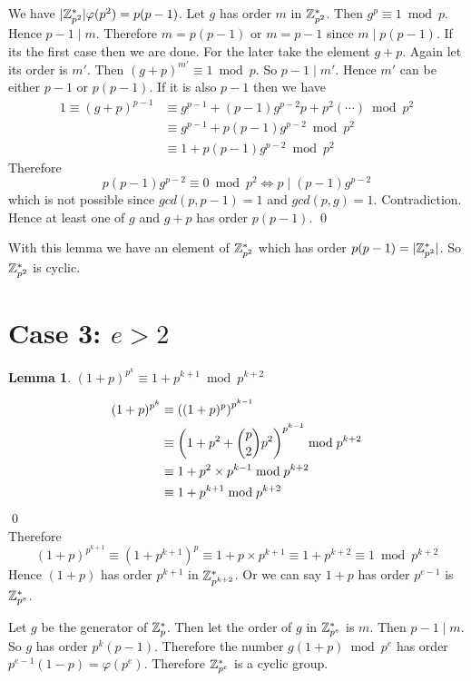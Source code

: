 \documentclass[a4paper, 11pt]{article}
\newtheorem{lemma}{Lemma}
\renewenvironment{proof}{\noindent{\it \textbf{Proof:}}\hspace*{1em}}{\qed\bigskip\\}
\begin{document}
{	\begin{proof}
		We have $|\mathbb{Z}_{p^2}^*|\varphi(p^2)=p(p-1)$. Let $g$ has order $m$ in $\mathbb{Z}_{p^2}^*$. Then $g^p\equiv 1\bmod p$. Hence $p-1\mid m$. Therefore $m=p(p-1)$ or $m=p-1$ since $m\mid p(p-1)$. If its the first case then we are done. For the later take the element $g+p$. Again let its order is $m'$. Then $(g+p)^{m'}\equiv 1\bmod p$. So $p-1\mid m'$. Hence $m'$ can be either $p-1$ or $p(p-1)$. If it is also $p-1$ then we have \begin{align*}
			1\equiv (g+p)^{p-1} & \equiv g^{p-1}+(p-1)g^{p-2}p+p^2(\cdots)\bmod {p^2}\\
			& \equiv g^{p-1}+p(p-1)g^{p-2}\bmod {p^2}\\
			& \equiv 1+p(p-1)g^{p-2}\bmod {p^2}
		\end{align*}
		Therefore $$p(p-1)g^{p-2}\equiv 0\bmod{p^2}\iff p\mid (p-1)g^{p-2}$$ which is not possible since $gcd(p,p-1)=1$ and $gcd(p,g)=1$. Contradiction. Hence at least one of $g$ and $g+p$ has order $p(p-1)$.  
	\end{proof}
	
	With this lemma we have an element of $\mathbb{Z}_{p^2}^*$ which has order $p(p-1)=|\mathbb{Z}_{p^2}^*|$. So $\mathbb{Z}_{p^2}^*$ is cyclic.
	
	
	
	
	\section*{Case 3: $e> 2$}
	\begin{lemma}
		$(1+p)^{p^k}\equiv 1+p^{k+1}\bmod {p^{k+2}}$
	\end{lemma}
	\begin{proof}
		\begin{align*}
			(1+p)^{p^k}& \equiv \left((1+p)^p   \right)^{p^{k-1}}\\
			& \equiv \left( 1+p^2+\binom{p}{2}p^2 \right)^{p^{k-1}}\bmod {p^{k+2}}\\
			& \equiv 1+p^2\times p^{k-1}\bmod p^{k+2}\\
			&\equiv 1+p^{k+1}\bmod{p^{k+2}}
		\end{align*}
	\end{proof}
	Therefore $$(1+p)^{p^{k+1}}\equiv(1+p^{k+1})^{p}\equiv 1+p\times p^{k+1}\equiv 1+p^{k+2}\equiv 1\bmod{p^{k+2}}$$Hence $(1+p)$ has order $p^{k+1}$ in $\mathbb{Z}_{p^{k+2}}^*$. Or we can say $1+p$ has order $p^{e-1}$ is $\mathbb{Z}_{p^e}^*$. 
	
	Let $g$ be the generator of $\mathbb{Z}_p^*$. Then let the order of $g$ in $\mathbb{Z}_{p^e}^*$ is $m$. Then $p-1\mid m$. So $g$ has order $p^k(p-1)$. Therefore the number $g(1+p)\bmod {p^e}$ has order $p^{e-1}(1-p)=\varphi(p^e)$. Therefore $\mathbb{Z}_{p^e}^*$ is a cyclic group.
	
}
\end{document}
